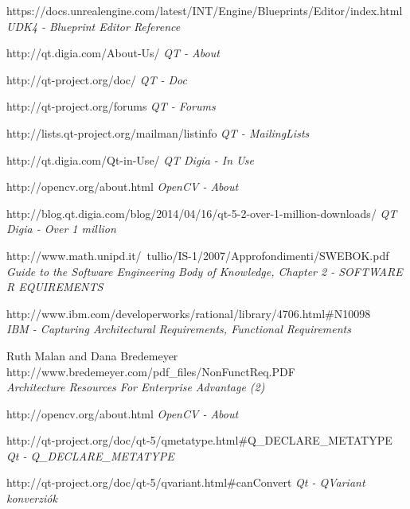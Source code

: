 \documentclass[a4paper,12pt,oneside]{report}
\begin{document}
\begin{thebibliography}{99}
		https://docs.unrealengine.com/latest/INT/Engine/Blueprints/Editor/index.html\\
        {\em UDK4 - Blueprint Editor Reference}  


		http://qt.digia.com/About-Us/
        {\em QT - About } 
 
        http://qt-project.org/doc/
        {\em QT - Doc} 
         
        http://qt-project.org/forums
        {\em QT - Forums}        

          http://lists.qt-project.org/mailman/listinfo 
        {\em QT - MailingLists}        


        http://qt.digia.com/Qt-in-Use/
        {\em QT Digia - In Use}  
        
        
        http://opencv.org/about.html
        {\em OpenCV - About}  
        
        
		http://blog.qt.digia.com/blog/2014/04/16/qt-5-2-over-1-million-downloads/
        {\em QT Digia - Over 1 million}  
        
        http://www.math.unipd.it/~tullio/IS-1/2007/Approfondimenti/SWEBOK.pdf\\
        {\em Guide to the Software Engineering Body of Knowledge, Chapter 2 - SOFTWARE R EQUIREMENTS}
        
        
		http://www.ibm.com/developerworks/rational/library/4706.html\#N10098 \\
        {\em IBM - Capturing Architectural Requirements, Functional Requirements }
        
		Ruth Malan and Dana Bredemeyer
		http://www.bredemeyer.com/pdf\_files/NonFunctReq.PDF \\
        {\em Architecture Resources For Enterprise Advantage (2)\\}
        

        http://opencv.org/about.html
        {\em OpenCV - About}  

		http://qt-project.org/doc/qt-5/qmetatype.html\#Q\_DECLARE\_METATYPE
        {\em Qt - Q\_DECLARE\_METATYPE}  

		http://qt-project.org/doc/qt-5/qvariant.html\#canConvert
        {\em Qt - QVariant konverziók}  


\end{thebibliography}
\end{document}
